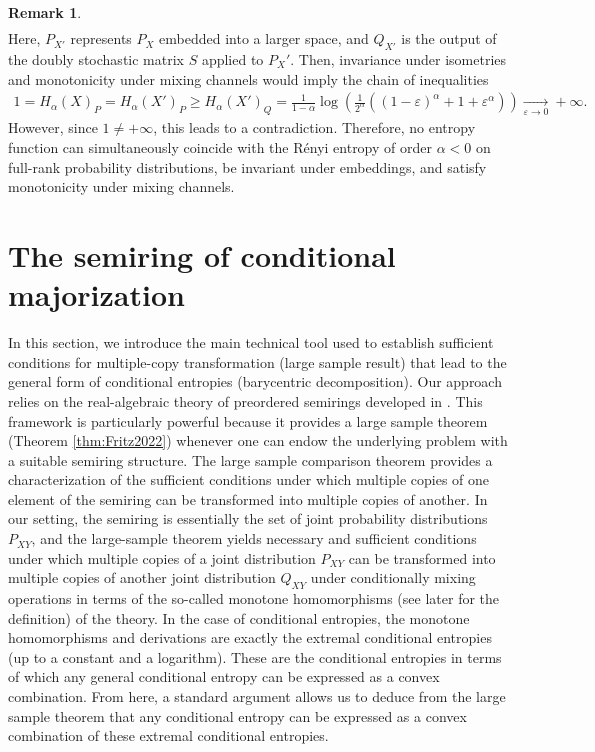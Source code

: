 \documentclass[aps,pra,11pt,onecolumn,nofootinbib,tightenlines]{revtex4-2}
\theoremstyle{definition}
\newtheorem{remark}[theorem]{Remark}
\begin{document}
\begin{remark}
\begin{align}
    \end{align}
Here, $P_{X'}$ represents $P_X$ embedded into a larger space, and $Q_{X'}$ is the output of the doubly stochastic matrix $S$ applied to $P_X'$. Then, invariance under isometries and monotonicity under mixing channels would imply the chain of inequalities
    \begin{align}
        1= H_\alpha(X)_P = H_\alpha(X')_P \geq H_\alpha(X')_Q = \frac{1}{1-\alpha}\log{\left(\frac{1}{2^\alpha}\left((1-\varepsilon)^{\alpha}+1+\varepsilon^\alpha\right)\right)} \xrightarrow[\varepsilon \to 0]{} +\infty.
    \end{align}
However, since $1 \neq  +\infty$, this leads to a contradiction. Therefore, no entropy function can simultaneously coincide with the Rényi entropy of order $\alpha < 0$ on full-rank probability distributions, be invariant under embeddings, and satisfy monotonicity under mixing channels.
\end{remark}

\section{The semiring of conditional majorization}
\label{sec: semiring of conditional entropies}
In this section, we introduce the main technical tool used to establish sufficient conditions for multiple-copy transformation (large sample result) that lead to the general form of conditional entropies (barycentric decomposition). Our approach relies on the real-algebraic theory of preordered semirings developed in \cite{fritz2023abstract,fritz2023abstractII}. This framework is particularly powerful because it provides a large sample theorem (Theorem \ref{thm:Fritz2022}) whenever one can endow the underlying problem with a suitable semiring structure.
The large sample comparison theorem provides a characterization of the sufficient conditions under which multiple copies of one element of the semiring can be transformed into multiple copies of another.
In our setting, the semiring is essentially the set of joint probability distributions $P_{XY}$, and the large-sample theorem yields necessary and sufficient conditions under which multiple copies of a joint distribution $P_{XY}$ can be transformed into multiple copies of another joint distribution $Q_{XY}$ under conditionally mixing operations in terms of the so-called monotone homomorphisms (see later for the definition) of the theory. In the case of conditional entropies, the monotone homomorphisms and derivations are exactly the extremal conditional entropies (up to a constant and a logarithm). These are the conditional entropies in terms of which any general conditional entropy can be expressed as a convex combination. From here, a standard argument \cite{mu21_renyi,haapasalo_inprep} allows us to deduce from the large sample theorem that any conditional entropy can be expressed as a convex combination of these extremal conditional entropies.
\end{document}
